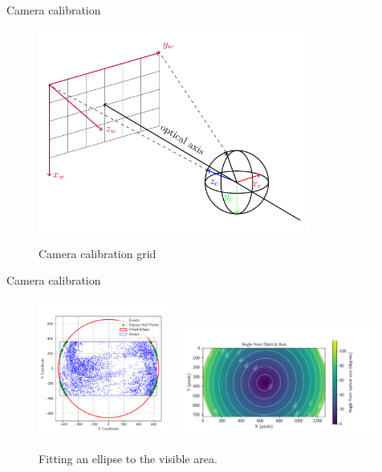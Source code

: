 \documentclass{beamer}
\begin{document}
\begin{frame}{Camera calibration}
   
   \begin{figure}[H]
        \centering
        \includegraphics[width=0.8\textwidth]{../fig/tikz/extrinsic.pdf}
        \label{fig:calib1}
        \caption{Camera calibration grid}
    \end{figure}
    
\end{frame}

\begin{frame}{Camera calibration}
   
   \begin{adjustwidth}{-4cm}{-4cm} %
        \begin{figure}
            \centering
            \includegraphics[width=0.40\textwidth]{./fig/pgfplot/build/ellipse_hull.pdf}
            \includegraphics[width=0.58\textwidth]{./fig/pgfplot/build/evk4_viz.pdf}
            \caption{Fitting an ellipse to the visible area.}
            \label{fig:calib2}
        \end{figure}
    \end{adjustwidth}
    
\end{frame}
\end{document}
